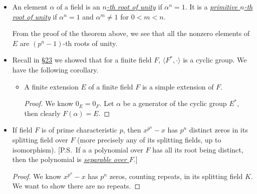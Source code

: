 \documentclass[11pt]{article}
\newcommand{\lk}[2]{\hyperlink{subsection.#1.#2}{\S#2}} %
\newcommand{\Z}{\mathbf{Z}}
\newcommand{\df}[1]{\ul{\textit{\textsf{#1}}}}
\newcommand{\la}{\langle}
\newcommand{\ra}{\rangle}
\newcommand{\clos}[1]{\overline{#1}}
\begin{document}
\begin{itemize}
    Furthermore, for field $E$ of $p^n$ elements contained in a splitting field $K$ of $x^{p^n}-x$ over $\Z_p$, the elements of $E$ are precisely the zeros of the polynomial $x^{p^n}-x \in \Z_p[x]$ in this splitting field $K$. (\emph{The two results will be very important at the end of the section!})
    
    \begin{proof}
        We know $\la E^*,\cdot \ra$ is a group of order $p^n - 1$. For any $\alpha \in E^*$, the order of $\alpha$ divides $p^n-1$. Therefore, $\alpha^{p^n-1} = 1$, which implies that $\alpha^{p^n} = \alpha$. Every element of $E$ is now a zero to $x^{p^n} - x$ in some splitting field $K$ of $x^{p^n} - x$ (created by adjoining all the elements of $E$ to $\Z_p$). Since $x^{p^n} - x$ can have at most $p^n$ distinct zeros in $K$, all the elements of $E$ must be exactly all the zeros in $K$ of $x^{p^n} - x$.
    \end{proof}
    \item An element $\alpha$ of a field is an \df{$n$-th root of unity} if $\alpha^n = 1$. It is a \df{primitive $n$-th root of unity} if $\alpha^n = 1$ and $\alpha^m \neq 1$ for $0 < m < n$.
    
    From the proof of the theorem above, we see that all the nonzero elements of $E$ are $(p^n-1)$-th roots of unity.
    \item Recall in \lk{4}{23} we showed that for a finite field $F$, $\la F^*,\cdot \ra$ is a cyclic group. We have the following corollary.
    \begin{itemize}
        \item A finite extension $E$ of a finite field $F$ is a simple extension of $F$.
        \begin{proof} We know $0_E = 0_F$. Let $\alpha$ be a generator of the cyclic group $E^*$, then clearly $F(\alpha) = E$.
        \end{proof}
    \end{itemize}
    \item If field $F$ is of prime characteristic $p$, then $x^{p^n} - x$ has $p^n$ distinct zeros in its splitting field over $F$ (more precisely any of its splitting fields, up to isomorphism). [P.S.\ If a a polynomial over $F$ has all its root being distinct, then the polynomial is \df{separable over $F$}.]
    \begin{proof}
        We know $x^{p^n}-x$ has $p^n$ zeros, counting repeats, in its splitting field $K$. We want to show there are no repeats.
        

\end{proof}
\end{itemize}
\end{document}
